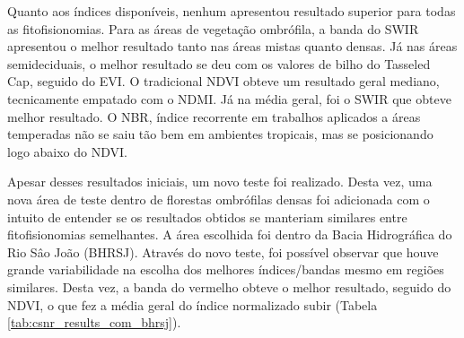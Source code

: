 Quanto aos índices disponíveis, nenhum apresentou resultado superior para todas as fitofisionomias. Para as áreas de vegetação ombrófila, a banda do SWIR apresentou o melhor resultado tanto nas áreas mistas quanto densas. Já nas áreas semideciduais, o melhor resultado se deu com os valores de bilho do Tasseled Cap, seguido do EVI. O tradicional NDVI obteve um resultado geral mediano, tecnicamente empatado com o NDMI. Já na média geral, foi o SWIR que obteve melhor resultado. O NBR, índice recorrente em trabalhos aplicados a áreas temperadas não se saiu tão bem em ambientes tropicais, mas se posicionando logo abaixo do NDVI.

Apesar desses resultados iniciais, um novo teste foi realizado. Desta vez, uma nova área de teste dentro de florestas ombrófilas densas foi adicionada com o intuito de entender se os resultados obtidos se manteriam similares entre fitofisionomias semelhantes. A área escolhida foi dentro da Bacia Hidrográfica do Rio Sâo João (BHRSJ). Através do novo teste, foi possível observar que houve grande variabilidade na escolha dos melhores índices/bandas mesmo em regiões similares. Desta vez, a banda do vermelho obteve o melhor resultado, seguido do NDVI, o que fez a média geral do índice normalizado subir (Tabela \ref{tab:csnr_results_com_bhrsj}).


